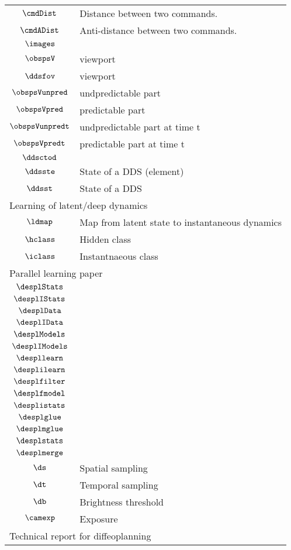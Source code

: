 \begin{longtable}{cl}
 $\cmdDist$ &  Distance between two commands.\\ 
 $\cmdADist$ &  Anti-distance between two commands.\\ 
 $\images$ & \\ 
 $\obspsV$ &  viewport\\ 
 $\ddsfov$ &  viewport\\ 
 $\obspsVunpred$ &  undpredictable part\\ 
 $\obspsVpred$ &  predictable part \\ 
 $\obspsVunpredt$ &  undpredictable part at time t\\ 
 $\obspsVpredt$ &  predictable part at time t\\ 
 $\ddsctod$ & \\ 
 $\ddsste$ &  State of a DDS (element)\\ 
 $\ddsst$ &  State of a DDS\\ 
 \multicolumn{2}{l}{Learning of latent/deep dynamics}\\ 
 \hline
$\ldmap$ &  Map from latent state to instantaneous dynamics\\ 
 $\hclass$ &  Hidden class\\ 
 $\iclass$ &  Instantnaeous class\\ 
 \multicolumn{2}{l}{Parallel learning paper}\\ 
 \hline
$\desplStats$ & \\ 
 $\desplIStats$ & \\ 
 $\desplData$ & \\ 
 $\desplIData$ & \\ 
 $\desplModels$ & \\ 
 $\desplIModels$ & \\ 
 $\despllearn$ & \\ 
 $\desplilearn$ & \\ 
 $\desplfilter$ & \\ 
 $\desplfmodel$ & \\ 
 $\desplistats$ & \\ 
 $\desplglue$ & \\ 
 $\desplmglue$ & \\ 
 $\desplstats$ & \\ 
 $\desplmerge$ & \\ 
 $\ds$ &  Spatial sampling\\ 
 $\dt$ &  Temporal sampling\\ 
 $\db$ &  Brightness threshold\\ 
 $\camexp$ &  Exposure\\ 
 \multicolumn{2}{l}{Technical report for diffeoplanning}\\ 

\end{longtable}
